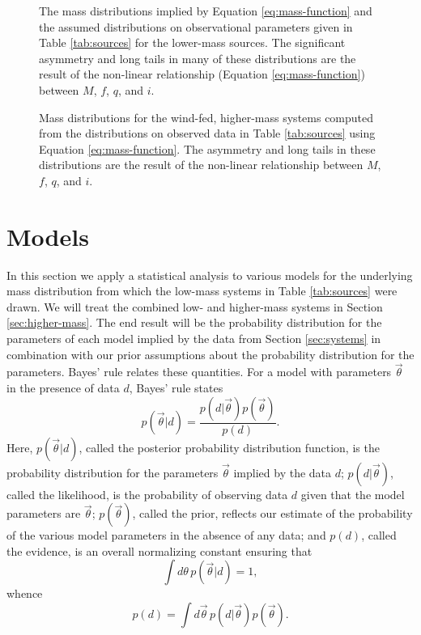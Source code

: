 \documentclass[preprint]{aastex}
\newcommand{\vtheta}{\vec{\theta}}
\begin{document}
\begin{figure}
  \begin{center}
  \end{center}

  \caption{\label{fig:low-masses} The mass distributions implied by
    Equation \eqref{eq:mass-function} and the assumed distributions on
    observational parameters given in Table \ref{tab:sources} for the
    lower-mass sources.  The significant asymmetry and long tails in
    many of these distributions are the result of the non-linear
    relationship (Equation \eqref{eq:mass-function}) between $M$, $f$,
    $q$, and $i$.}
\end{figure}

\begin{figure}
  \begin{center}
  \end{center}
  \caption{\label{fig:high-masses} Mass distributions for the
    wind-fed, higher-mass systems computed from the distributions on
    observed data in Table \ref{tab:sources} using Equation
    \eqref{eq:mass-function}.  The asymmetry and long tails in these
    distributions are the result of the non-linear relationship
    between $M$, $f$, $q$, and $i$.}
\end{figure}

\section{Models}
\label{sec:models}

In this section we apply a statistical analysis to various models for
the underlying mass distribution from which the low-mass systems in
Table \ref{tab:sources} were drawn.  We will treat the combined low-
and higher-mass systems in Section \ref{sec:higher-mass}.  The end
result will be the probability distribution for the parameters of each
model implied by the data from Section \ref{sec:systems} in
combination with our prior assumptions about the probability
distribution for the parameters.  Bayes' rule relates these
quantities.  For a model with parameters $\vtheta$ in the presence of
data $d$, Bayes' rule states
\begin{equation}
  \label{eq:Bayes-rule}
  p(\vtheta | d) = \frac{p(d | \vtheta) p(\vtheta)}{p(d)}.
\end{equation}
Here, $p(\vtheta|d)$, called the posterior probability distribution
function, is the probability distribution for the parameters $\vtheta$
implied by the data $d$; $p(d|\vtheta)$, called the likelihood, is the
probability of observing data $d$ given that the model parameters are
$\vtheta$; $p(\vtheta)$, called the prior, reflects our estimate of the
probability of the various model parameters in the absence of any
data; and $p(d)$, called the evidence, is an overall normalizing
constant ensuring that
\begin{equation}
  \int d\theta\, p(\vtheta|d) = 1,
\end{equation}
whence
\begin{equation}
  \label{eq:evidence-def}
  p(d) = \int d\vtheta\, p(d|\vtheta) p(\vtheta).
\end{equation}
\end{document}
